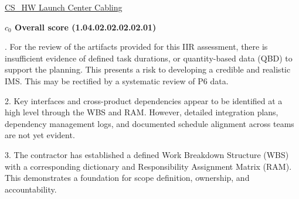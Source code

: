 % 


\begin{frame}{\href{run:../local/source-docs/1.04.02.02.02.02.01.pdf}{CS\_HW Launch Center Cabling}}
\centering
{}
\par
\vspace{0.75em}
\textbf{\small{\(c_0\) Overall score {\tiny (1.04.02.02.02.02.01)}}}\\\par
\vspace{0.5em}
\begin{minipage}{0.85\textwidth}
\raggedright
\fontsize{7}{9}. For the review of the artifacts provided for this IIR assessment, there is insufficient evidence of defined task durations, or quantity-based data (QBD) to support the planning. This presents a risk to developing a credible and realistic IMS. This may be rectified by a systematic review of P6 data.\par\vspace{0.5em}2. Key interfaces and cross-product dependencies appear to be identified at a high level through the WBS and RAM. However, detailed integration plans, dependency management logs, and documented schedule alignment across teams are not yet evident.\par\vspace{0.5em}3. The contractor has established a defined Work Breakdown Structure (WBS) with a corresponding dictionary and Responsibility Assignment Matrix (RAM). This demonstrates a foundation for scope definition, ownership, and accountability.\par
\end{minipage}
\end{frame}
